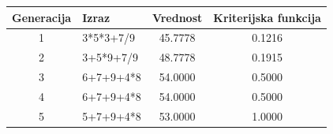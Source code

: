\begin{tabular}{|c|l|c|c|}\hline
Generacija & Izraz & Vrednost & Kriterijska funkcija \\ \hline
1 & 3*5*3+7/9 & 45.7778 & 0.1216 \\ \hline
2 & 3+5*9+7/9 & 48.7778 & 0.1915 \\ \hline
3 & 6+7+9+4*8 & 54.0000 & 0.5000 \\ \hline
4 & 6+7+9+4*8 & 54.0000 & 0.5000 \\ \hline
5 & 5+7+9+4*8 & 53.0000 & 1.0000 \\ \hline
\end{tabular}
